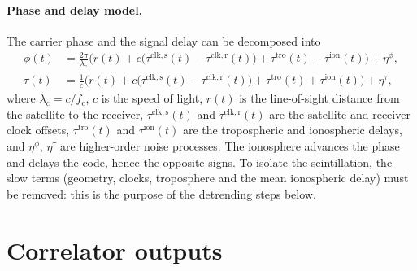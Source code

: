 \documentclass{article}
\begin{document}
\paragraph{Phase and delay model.} The carrier phase and the signal delay can be decomposed into \cite{wendlerScintillationProcessingSoftware2016}
\begin{align}
  \phi(t) &= \frac{2\pi}{\lambda_\mathrm{c}} \Big( r(t) + c\big(\tau^{\mathrm{clk,s}}(t) - \tau^{\mathrm{clk,r}}(t)\big) + \tau^{\mathrm{tro}}(t) - \tau^{\mathrm{ion}}(t) \Big) + \eta^\phi, \\
  \tau(t) &= \frac{1}{c} \Big( r(t) + c\big(\tau^{\mathrm{clk,s}}(t) - \tau^{\mathrm{clk,r}}(t)\big) + \tau^{\mathrm{tro}}(t) + \tau^{\mathrm{ion}}(t) \Big) + \eta^\tau,
\end{align}
where $\lambda_\mathrm{c} = c/f_\mathrm{c}$, $c$ is the speed of light, $r(t)$ is the line-of-sight distance from the satellite to the receiver, $\tau^{\mathrm{clk,s}}(t)$ and $\tau^{\mathrm{clk,r}}(t)$ are the satellite and receiver clock offsets, $\tau^{\mathrm{tro}}(t)$ and $\tau^{\mathrm{ion}}(t)$ are the tropospheric and ionospheric delays, and $\eta^\phi$, $\eta^\tau$ are higher-order noise processes. The ionosphere advances the phase and delays the code, hence the opposite signs. To isolate the scintillation, the slow terms (geometry, clocks, troposphere and the mean ionospheric delay) must be removed: this is the purpose of the detrending steps below.

\section{Correlator outputs}
\label{sec:correlator-outputs}
\end{document}
